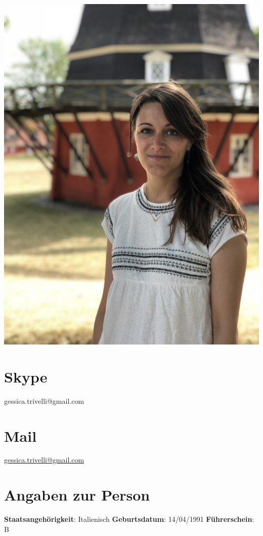 \documentclass[11pt]{friggeri-cv}
\begin{document}

\begin{aside}
  \includegraphics[width=0.95\columnwidth]{img/IMG_2838}
  \section{Skype}{\footnotesize{
    gessica.trivelli@gmail.com}}
  \section{Mail}{\footnotesize{
    \href{mailto:gessica.trivelli@gmail.com}{gessica.trivelli@gmail.com}}}
  \section{Angaben zur Person}\footnotesize{
    \textbf{Staatsangeh\"{o}rigkeit}: 
    Italienisch
    \textbf{Geburtsdatum}:
    14/04/1991
    \textbf{F\"{u}hrerschein}:
    B}
\end{aside}
\end{document}
